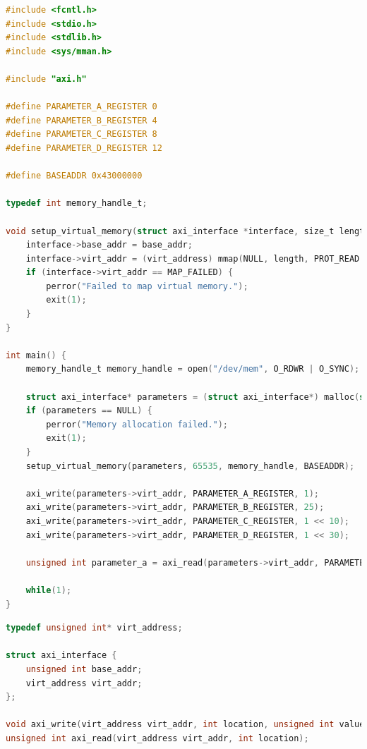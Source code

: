 \begin{lstlisting}[breaklines, language=C, label=lis:axi-dma-petalinux-main, caption=Obsługa modułu w trybie systemowym - \texttt{main.c}.]
#include <fcntl.h>
#include <stdio.h>
#include <stdlib.h>
#include <sys/mman.h>

#include "axi.h"

#define PARAMETER_A_REGISTER 0
#define PARAMETER_B_REGISTER 4
#define PARAMETER_C_REGISTER 8
#define PARAMETER_D_REGISTER 12

#define BASEADDR 0x43000000

typedef int memory_handle_t;

void setup_virtual_memory(struct axi_interface *interface, size_t length, memory_handle_t memory_handle, off_t base_addr) {
	interface->base_addr = base_addr;
	interface->virt_addr = (virt_address) mmap(NULL, length, PROT_READ | PROT_WRITE, MAP_SHARED, memory_handle, base_addr);
	if (interface->virt_addr == MAP_FAILED) {
		perror("Failed to map virtual memory.");
		exit(1);
	}
}

int main() {
	memory_handle_t memory_handle = open("/dev/mem", O_RDWR | O_SYNC);
	
	struct axi_interface* parameters = (struct axi_interface*) malloc(sizeof(struct axi_interface));
	if (parameters == NULL) {
		perror("Memory allocation failed.");
		exit(1);
	}
	setup_virtual_memory(parameters, 65535, memory_handle, BASEADDR);
	
	axi_write(parameters->virt_addr, PARAMETER_A_REGISTER, 1);
	axi_write(parameters->virt_addr, PARAMETER_B_REGISTER, 25);
	axi_write(parameters->virt_addr, PARAMETER_C_REGISTER, 1 << 10);
	axi_write(parameters->virt_addr, PARAMETER_D_REGISTER, 1 << 30);
	
	unsigned int parameter_a = axi_read(parameters->virt_addr, PARAMETER_A_REGISTER);
	
	while(1);
}
\end{lstlisting}

\begin{lstlisting}[breaklines, language=C, label=lis:axi-dma-petalinux-axi-h, caption=Obsługa modułu w trybie systemowym - \texttt{axi.h}.]
typedef unsigned int* virt_address;

struct axi_interface {
	unsigned int base_addr;
	virt_address virt_addr;
};

void axi_write(virt_address virt_addr, int location, unsigned int value);
unsigned int axi_read(virt_address virt_addr, int location);
\end{lstlisting}

